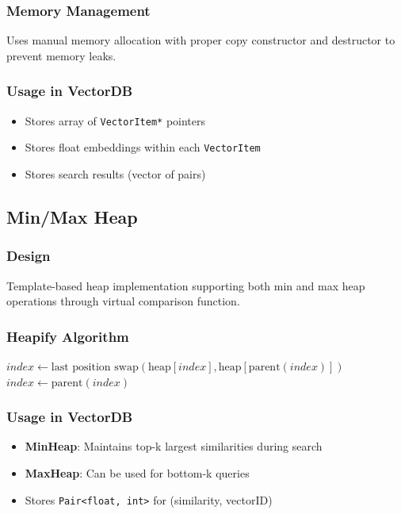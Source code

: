 \documentclass[12pt,a4paper]{article}
\begin{document}
\subsubsection{Memory Management}
Uses manual memory allocation with proper copy constructor and destructor to prevent memory leaks.

\subsubsection{Usage in VectorDB}
\begin{itemize}
    \item Stores array of \texttt{VectorItem*} pointers
    \item Stores float embeddings within each \texttt{VectorItem}
    \item Stores search results (vector of pairs)
\end{itemize}

\subsection{Min/Max Heap}

\subsubsection{Design}
Template-based heap implementation supporting both min and max heap operations through virtual comparison function.

\subsubsection{Heapify Algorithm}
\begin{algorithm}
\caption{Heapify Up}
\begin{algorithmic}[1]
\State $index \gets \text{last position}$
    \State $\text{swap}(\text{heap}[index], \text{heap}[\text{parent}(index)])$
    \State $index \gets \text{parent}(index)$
\EndWhile
\end{algorithmic}
\end{algorithm}

\subsubsection{Usage in VectorDB}
\begin{itemize}
    \item \textbf{MinHeap}: Maintains top-k largest similarities during search
    \item \textbf{MaxHeap}: Can be used for bottom-k queries
    \item Stores \texttt{Pair<float, int>} for (similarity, vectorID)
\end{itemize}
\end{document}
